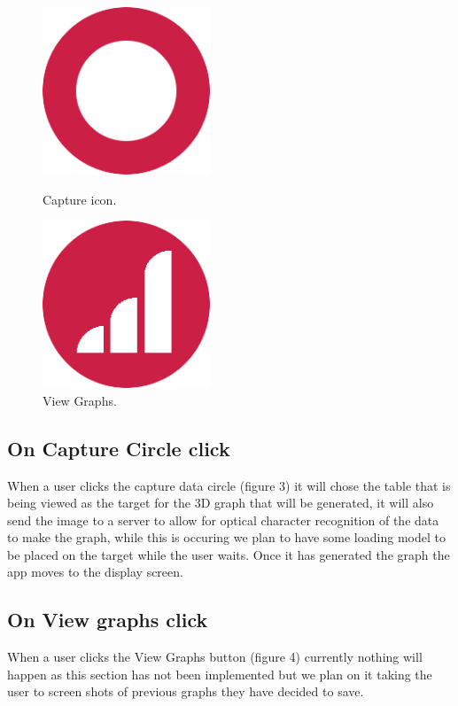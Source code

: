 \documentclass[a4paper,12pt]{article}
\begin{document}
\begin{figure}[H]
  \centering
  \begin{minipage}[b]{0.4\textwidth}
    \includegraphics[width=50mm]{images/capture.png}
    \caption{Capture icon.}
  \end{minipage}
  \hfill
  \begin{minipage}[b]{0.4\textwidth}
    \includegraphics[width=50mm]{images/graphRed.png}
    \caption{View Graphs.}
  \end{minipage}
\end{figure}



\subsection{On Capture Circle click}
When a user clicks the capture data circle (figure 3) it will chose the table that is being viewed as the target for the 3D graph that will be generated, it will also send the image to a server to allow for optical character recognition of the data to make the graph, while this is occuring we plan to have some loading model to be placed on the target while the user waits. Once it has generated the graph the app moves to the display screen.

\subsection{On View graphs click}
When a user clicks the View Graphs button (figure 4) currently nothing will happen as this section has not been implemented but we plan on it taking the user to screen shots of previous graphs they have decided to save. 
\newpage
\end{document}

